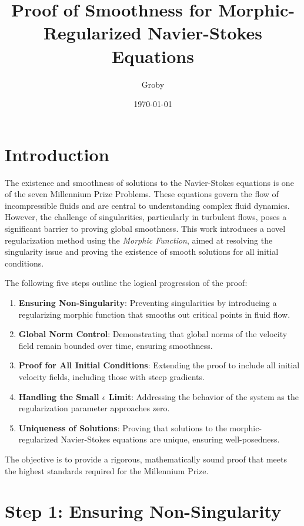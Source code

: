 \documentclass{article}
\title{Proof of Smoothness for Morphic-Regularized Navier-Stokes Equations}
\author{Groby}
\date{\today}
\begin{document}
\maketitle

\section*{Introduction}

The existence and smoothness of solutions to the Navier-Stokes equations is one of the seven Millennium Prize Problems. These equations govern the flow of incompressible fluids and are central to understanding complex fluid dynamics. However, the challenge of singularities, particularly in turbulent flows, poses a significant barrier to proving global smoothness. This work introduces a novel regularization method using the \textit{Morphic Function}, aimed at resolving the singularity issue and proving the existence of smooth solutions for all initial conditions.

The following five steps outline the logical progression of the proof:
\begin{enumerate}
    \item \textbf{Ensuring Non-Singularity}: Preventing singularities by introducing a regularizing morphic function that smooths out critical points in fluid flow.
    \item \textbf{Global Norm Control}: Demonstrating that global norms of the velocity field remain bounded over time, ensuring smoothness.
    \item \textbf{Proof for All Initial Conditions}: Extending the proof to include all initial velocity fields, including those with steep gradients.
    \item \textbf{Handling the Small \(\epsilon\) Limit}: Addressing the behavior of the system as the regularization parameter approaches zero.
    \item \textbf{Uniqueness of Solutions}: Proving that solutions to the morphic-regularized Navier-Stokes equations are unique, ensuring well-posedness.
\end{enumerate}

The objective is to provide a rigorous, mathematically sound proof that meets the highest standards required for the Millennium Prize.

\section*{Step 1: Ensuring Non-Singularity}
\end{document}
